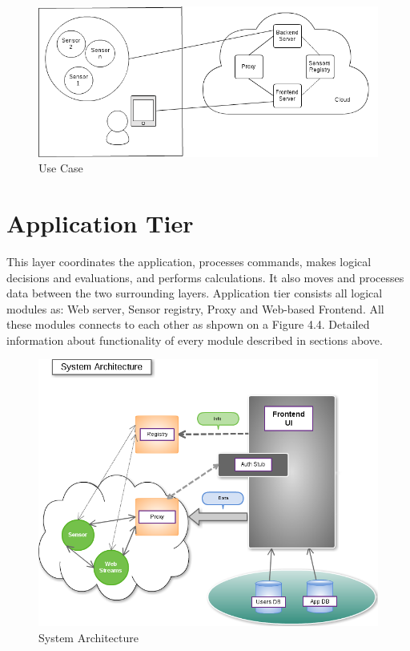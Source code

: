         \begin{figure}[!ht]
        \centering
        \includegraphics[scale=0.5]{images/User_Case.png}   
        \caption[Use Case]{Use Case}
        \label{img:structure}                           
        \end{figure}

\section{Application Tier}
  This layer coordinates the application, processes commands, makes logical decisions and evaluations, and performs calculations. It also moves and processes data between the two surrounding layers.
  \newline
  Application tier consists all logical modules as: Web server, Sensor registry, Proxy and Web-based Frontend. All these modules connects to each other as shpown on a Figure 4.4. Detailed information about functionality of every module described in sections above.
    \begin{figure}[!ht]
    \centering
    \includegraphics[scale=0.5]{images/Structure.png}   
    \caption[System Architecture]{System Architecture}
    \label{img:structure}                           
    \end{figure}

